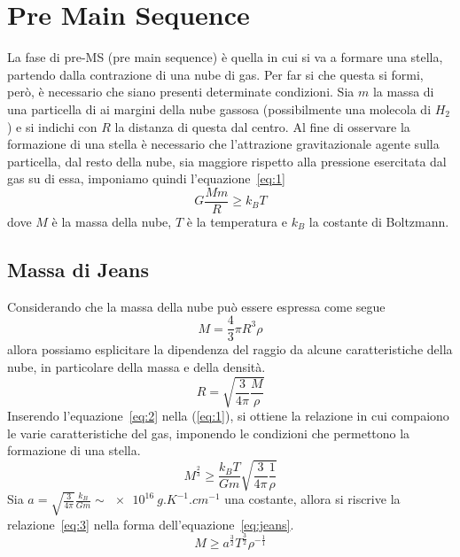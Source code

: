 \section{Pre Main Sequence}\label{sec:pre-main-sequence}

La fase di pre-MS (pre main sequence) è quella in cui si va a formare una stella, partendo dalla contrazione di una nube di gas. Per far si che questa si formi, però, è necessario che siano presenti determinate condizioni. Sia $m$ la massa di una particella di ai margini della nube gassosa (possibilmente una molecola di $H_2$) e si indichi con $R$ la distanza di questa dal centro. Al fine di osservare la formazione di una stella è necessario che l'attrazione gravitazionale agente sulla particella, dal resto della nube, sia maggiore rispetto alla pressione esercitata dal gas su di essa, imponiamo quindi l'equazione~\ref{eq:1}
\begin{equation}
    G \frac{M m}{R} \geq k_B T
    \label{eq:1}
\end{equation}
dove $M$ è la massa della nube, $T$ è la temperatura e $k_B$ la costante di Boltzmann.
\subsection{Massa di Jeans}

Considerando che la massa della nube può essere espressa come segue
\[
    M = \frac{4}{3} \pi R^3 \rho
\]
allora possiamo esplicitare la dipendenza del raggio da alcune caratteristiche della nube, in particolare della massa e della densità.
\begin{equation}
    R = \sqrt{\frac{3}{4\pi} \frac{M}{\rho}}
    \label{eq:2}
\end{equation}
Inserendo l'equazione~\ref{eq:2} nella (\ref{eq:1}), si ottiene la relazione in cui compaiono le varie caratteristiche del gas, imponendo le condizioni che permettono la formazione di una stella.
\begin{equation}
    M^{\frac{2}{3}} \geq \frac{k_B T}{G m} \sqrt{\frac{3}{4\pi} \frac{1}{\rho}}
    \label{eq:3}
\end{equation}
Sia $a = \sqrt{\frac{3}{4\pi}}\frac{k_B}{G m} \sim \SI{e16}{g.K^{-1}.cm^{-1}}$ una costante, allora si riscrive la relazione~\ref{eq:3} nella forma dell'equazione~\ref{eq:jeans}.
\begin{equation}
    M \geq a^{\frac{3}{2}} T^{\frac{3}{2}} \rho^{-\frac{1}{1}}
\label{eq:jeans}
\end{equation}


